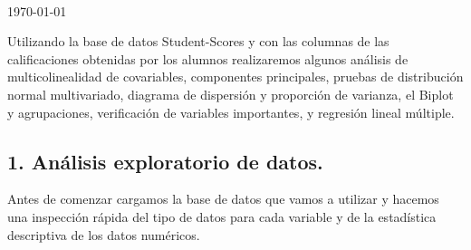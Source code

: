 \documentclass[
]{article}
\begin{document}
\begin{titlepage}
	~
	
	
	{\today}\\[2cm] %
	
	

	
	
	\vfill %
	
\end{titlepage}

{
\setcounter{tocdepth}{3}
\tableofcontents
}

Utilizando la base de datos Student-Scores y con las columnas de las
calificaciones obtenidas por los alumnos realizaremos algunos análisis
de multicolinealidad de covariables, componentes principales, pruebas de
distribución normal multivariado, diagrama de dispersión y proporción de
varianza, el Biplot y agrupaciones, verificación de variables
importantes, y regresión lineal múltiple.

\hypertarget{anuxe1lisis-exploratorio-de-datos.}{%
\subsection{1. Análisis exploratorio de
datos.}\label{anuxe1lisis-exploratorio-de-datos.}}

Antes de comenzar cargamos la base de datos que vamos a utilizar y
hacemos una inspección rápida del tipo de datos para cada variable y de
la estadística descriptiva de los datos numéricos.
\end{document}
